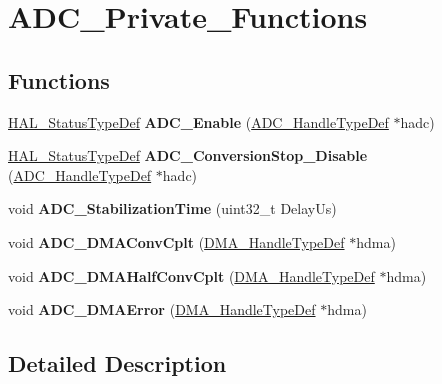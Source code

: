 \hypertarget{group___a_d_c___private___functions}{}\section{A\+D\+C\+\_\+\+Private\+\_\+\+Functions}
\label{group___a_d_c___private___functions}
\subsection*{Functions}
\begin{DoxyCompactItemize}
\item 
\mbox{\label{group___a_d_c___private___functions_ga034b9253bac7f083ec43b5b09873ebf1}} 
\hyperlink{stm32f1xx__hal__def_8h_a63c0679d1cb8b8c684fbb0632743478f}{H\+A\+L\+\_\+\+Status\+Type\+Def} {\bfseries A\+D\+C\+\_\+\+Enable} (\hyperlink{struct_a_d_c___handle_type_def}{A\+D\+C\+\_\+\+Handle\+Type\+Def} $\ast$hadc)
\item 
\mbox{\label{group___a_d_c___private___functions_ga646e302bd6f80b1a063f31b556806630}} 
\hyperlink{stm32f1xx__hal__def_8h_a63c0679d1cb8b8c684fbb0632743478f}{H\+A\+L\+\_\+\+Status\+Type\+Def} {\bfseries A\+D\+C\+\_\+\+Conversion\+Stop\+\_\+\+Disable} (\hyperlink{struct_a_d_c___handle_type_def}{A\+D\+C\+\_\+\+Handle\+Type\+Def} $\ast$hadc)
\item 
\mbox{\label{group___a_d_c___private___functions_gae7b1bbe670aef90157adbb5616202df3}} 
void {\bfseries A\+D\+C\+\_\+\+Stabilization\+Time} (uint32\+\_\+t Delay\+Us)
\item 
\mbox{\label{group___a_d_c___private___functions_ga055840e53820295bac4f4f0998ffcfb0}} 
void {\bfseries A\+D\+C\+\_\+\+D\+M\+A\+Conv\+Cplt} (\hyperlink{group___d_m_a___exported___types_ga92b907d56a9c29b93d46782a7a04f91e}{D\+M\+A\+\_\+\+Handle\+Type\+Def} $\ast$hdma)
\item 
\mbox{\label{group___a_d_c___private___functions_ga27abcd16a928caf2b6c719ea67c12b25}} 
void {\bfseries A\+D\+C\+\_\+\+D\+M\+A\+Half\+Conv\+Cplt} (\hyperlink{group___d_m_a___exported___types_ga92b907d56a9c29b93d46782a7a04f91e}{D\+M\+A\+\_\+\+Handle\+Type\+Def} $\ast$hdma)
\item 
\mbox{\label{group___a_d_c___private___functions_gaede41b9e917d64ad31fbbb8ae9fab79c}} 
void {\bfseries A\+D\+C\+\_\+\+D\+M\+A\+Error} (\hyperlink{group___d_m_a___exported___types_ga92b907d56a9c29b93d46782a7a04f91e}{D\+M\+A\+\_\+\+Handle\+Type\+Def} $\ast$hdma)
\end{DoxyCompactItemize}


\subsection{Detailed Description}
